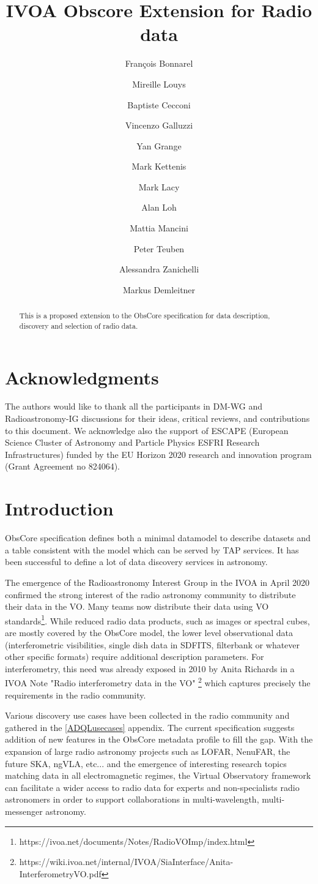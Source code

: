 \documentclass[11pt,a4paper]{ivoa}
\title{IVOA Obscore Extension for Radio data}
\author{Fran\c cois Bonnarel}
\author{Mireille Louys}
\author{Baptiste Cecconi}
\author{Vincenzo Galluzzi}
\author{Yan Grange}
\author{Mark Kettenis}
\author{Mark Lacy}
\author{Alan Loh}
\author{Mattia Mancini}
\author{Peter Teuben}
\author{Alessandra Zanichelli}
\author{Markus Demleitner}
\begin{document}
\begin{abstract}
This is a proposed extension to the ObsCore specification for data description, discovery and selection of radio data.
\end{abstract}

\section*{Acknowledgments}

The authors would like to thank all the participants in DM-WG and Radioastronomy-IG discussions
for their ideas, critical reviews, and contributions to this document.
We acknowledge also the support of  ESCAPE (European Science Cluster of Astronomy
and Particle Physics ESFRI Research Infrastructures) funded by the EU Horizon
2020 research and innovation program (Grant Agreement no 824064).

\section{Introduction}


ObsCore specification \citep{2017ivoa.spec.0509L} defines both a minimal datamodel to describe datasets
and a table consistent with the model which can be served by TAP services. It has been successful
to define a lot of data discovery services in astronomy.

The emergence  of  the Radioastronomy Interest Group in the IVOA in April 2020 confirmed the strong
interest of the radio astronomy community to distribute their data in the VO. Many teams now
distribute their data using VO standards\footnote{https://ivoa.net/documents/Notes/RadioVOImp/index.html}.
While reduced radio data products, such as images or spectral cubes,%
are mostly covered by the ObsCore model, the lower level observational data
(interferometric visibilities, single dish data in SDFITS, filterbank or whatever other specific formats) require additional description parameters.
For interferometry, this need  was already exposed
in 2010 by Anita Richards in a IVOA Note  "Radio interferometry data in the VO" 
\footnote{https://wiki.ivoa.net/internal/IVOA/SiaInterface/Anita-InterferometryVO.pdf} which captures precisely the requirements in the radio community.
 
 Various discovery use cases have been collected in the radio community and gathered in the \ref{ADQLusecases} appendix.
  The current specification suggests addition of new features in the ObsCore metadata profile to fill the gap.
With the expansion of large radio astronomy projects such as LOFAR, NenuFAR, the future SKA, ngVLA, etc...
and the emergence of interesting research topics matching data in all electromagnetic regimes, the
Virtual Observatory framework can facilitate a wider access to radio data for experts and
non-specialists radio astronomers in order to support collaborations in multi-wavelength,
multi-messenger astronomy.
\end{document}

